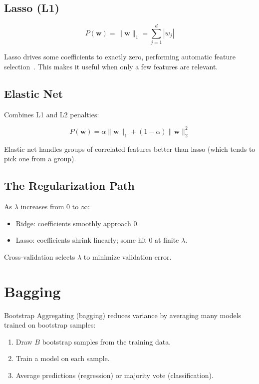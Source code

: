 \subsection{Lasso (L1)}

\[
	P(\mathbf{w}) = \|\mathbf{w}\|_1 = \sum_{j=1}^d |w_j|
\]

Lasso drives some coefficients to exactly zero, performing automatic feature selection~\cite{tibshirani1996regression}. This makes it useful when only a few features are relevant.

\subsection{Elastic Net}

Combines L1 and L2 penalties:

\[
	P(\mathbf{w}) = \alpha \|\mathbf{w}\|_1 + (1 - \alpha) \|\mathbf{w}\|_2^2
\]

Elastic net handles groups of correlated features better than lasso (which tends to pick one from a group).

\subsection{The Regularization Path}

As $\lambda$ increases from 0 to $\infty$:

\begin{itemize}
	\item Ridge: coefficients smoothly approach 0.
	\item Lasso: coefficients shrink linearly; some hit 0 at finite $\lambda$.
\end{itemize}

Cross-validation selects $\lambda$ to minimize validation error.

\section{Bagging}

Bootstrap Aggregating (bagging) reduces variance by averaging many models trained on bootstrap samples:

\begin{enumerate}
	\item Draw $B$ bootstrap samples from the training data.
	\item Train a model on each sample.
	\item Average predictions (regression) or majority vote (classification).
\end{enumerate}

